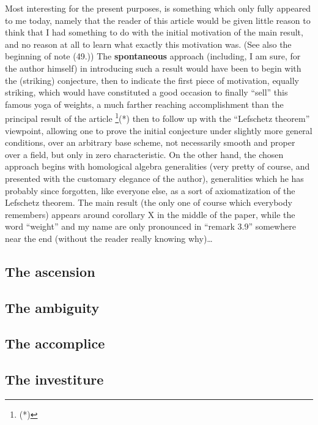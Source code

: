 Most interesting for the present purposes, is something 
which only fully appeared to me today, namely that the reader of this article would be
given little reason to think that I had something to do with the initial motivation of the
main result, and no reason at all to learn what exactly this motivation was. 
(See also the beginning of note (49.))
The \textbf{spontaneous} approach
(including, I am sure, for the author himself)
in introducing such a result would have been to begin with the (striking) conjecture,
then to indicate the first piece of motivation, equally striking, which would have
constituted a good occasion to finally ``sell'' this famous yoga of weights, a much
farther reaching accomplishment than the principal result of the article
\footnote{(*)}(*) then to follow up with the 
``Lefschetz theorem'' viewpoint, allowing one to prove the initial conjecture under
slightly more general conditions, over an arbitrary base scheme, not necessarily smooth
and proper over a field, but only in zero characteristic. 
On the other hand, the chosen approach begins with homological algebra generalities
(very pretty of course, and presented with the customary elegance of the author), 
generalities which he has probably since forgotten, like everyone else, 
as a sort of axiomatization of the Lefschetz theorem. The main result (the only one of
course which everybody remembers) appears around corollary X in the middle of the paper, 
while the word ``weight'' and my name are only pronounced in ``remark 3.9'' somewhere near
the end (without the reader really knowing why)\ldots


\subsection{The ascension}


\subsection{The ambiguity}


\subsection{The accomplice}


\subsection{The investiture}

